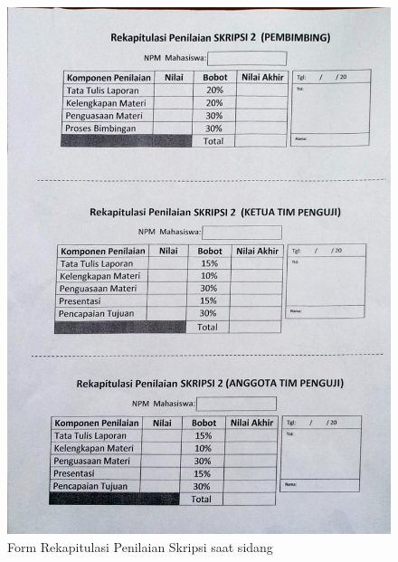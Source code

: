 \begin{figure}[H]
	\centering
	\includegraphics[scale=0.20]{Gambar/dokumen_rekap}
	\caption[Form Rekapitulasi Penilaian Skripsi saat sidang]{Form Rekapitulasi Penilaian Skripsi saat sidang} 
	\label{fig: rekapAsli}
\end{figure}